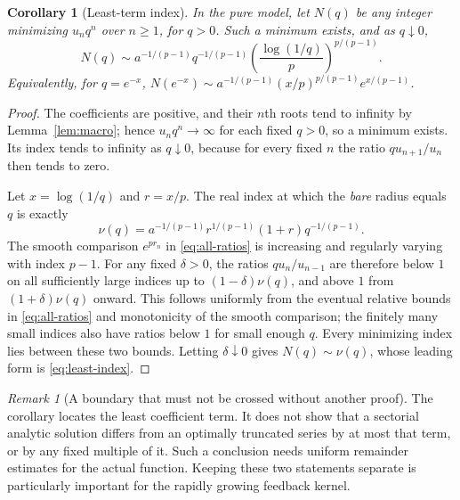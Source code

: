 \documentclass[11pt,a4paper]{article}
\numberwithin{equation}{section}
\newtheorem{corollary}[theorem]{Corollary}
\theoremstyle{definition}
\theoremstyle{remark}
\newtheorem{remark}[theorem]{Remark}
\begin{document}
\begin{corollary}[Least-term index]
\label{cor:least-term}
In the pure model, let $N(q)$ be any integer minimizing $u_nq^n$ over
$n\ge1$, for $q>0$. Such a minimum exists, and as $q\downarrow0$,
\begin{equation}
 \boxed{\quad
 N(q)\sim a^{-1/(p-1)}q^{-1/(p-1)}
       \left(\frac{\log(1/q)}p\right)^{p/(p-1)}.
 \quad}
 \label{eq:least-index}
\end{equation}
Equivalently, for $q=e^{-x}$,
$N(e^{-x})\sim a^{-1/(p-1)}(x/p)^{p/(p-1)}e^{x/(p-1)}$.
\end{corollary}

\begin{proof}
The coefficients are positive, and their $n$th roots tend to infinity by
Lemma~\ref{lem:macro}; hence $u_nq^n\to\infty$ for each fixed $q>0$,
so a minimum exists. Its index tends to infinity as $q\downarrow0$, because
for every fixed $n$ the ratio $q u_{n+1}/u_n$ then tends to zero.

Let $x=\log(1/q)$ and $r=x/p$. The real index at which the \emph{bare}
radius equals $q$ is exactly
\begin{equation}
 \nu(q)=a^{-1/(p-1)}r^{1/(p-1)}(1+r)q^{-1/(p-1)}.
 \label{eq:least-bare-index}
\end{equation}
The smooth comparison $e^{pr_n}$ in \eqref{eq:all-ratios} is increasing
and regularly varying with index $p-1$. For any fixed $\delta>0$, the
ratios $q u_n/u_{n-1}$ are therefore below $1$ on all sufficiently large
indices up to $(1-\delta)\nu(q)$, and above $1$ from
$(1+\delta)\nu(q)$ onward. This follows uniformly from the eventual
relative bounds in \eqref{eq:all-ratios} and monotonicity of the smooth
comparison; the finitely many small indices also have ratios below $1$
for small enough $q$. Every minimizing index lies between these two
bounds. Letting $\delta\downarrow0$ gives $N(q)\sim\nu(q)$, whose
leading form is \eqref{eq:least-index}.
\end{proof}

\begin{remark}[A boundary that must not be crossed without another proof]
The corollary locates the least coefficient term. It does not show that a
sectorial analytic solution differs from an optimally truncated series by
at most that term, or by any fixed multiple of it. Such a conclusion needs
uniform remainder estimates for the actual function. Keeping these two
statements separate is particularly important for the rapidly growing
feedback kernel.
\end{remark}
\end{document}
